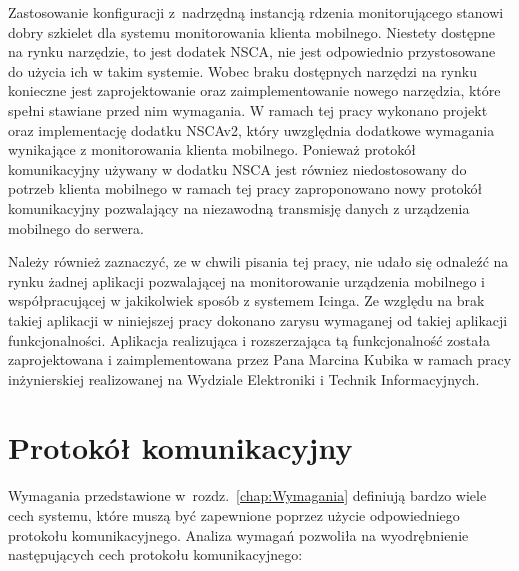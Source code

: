 Zastosowanie konfiguracji z~nadrzędną instancją rdzenia monitorującego
stanowi dobry szkielet dla systemu monitorowania klienta
mobilnego. Niestety dostępne na rynku narzędzie, to jest dodatek NSCA,
nie jest odpowiednio przystosowane do użycia ich w takim
systemie. Wobec braku dostępnych narzędzi na rynku konieczne jest
zaprojektowanie oraz zaimplementowanie nowego narzędzia, które spełni
stawiane przed nim wymagania. W ramach tej pracy wykonano projekt oraz
implementację dodatku NSCAv2, który uwzględnia dodatkowe wymagania
wynikające z monitorowania klienta mobilnego. Ponieważ protokół
komunikacyjny używany w dodatku NSCA jest równiez niedostosowany do
potrzeb klienta mobilnego w ramach tej pracy zaproponowano nowy
protokół komunikacyjny pozwalający na niezawodną transmisję danych z
urządzenia mobilnego do serwera.

Należy również zaznaczyć, ze w chwili pisania tej pracy, nie udało się
odnaleźć na rynku żadnej aplikacji pozwalającej na monitorowanie
urządzenia mobilnego i współpracującej w jakikolwiek sposób z systemem
Icinga. Ze względu na brak takiej aplikacji w niniejszej pracy
dokonano zarysu wymaganej od takiej aplikacji
funkcjonalności. Aplikacja realizująca i rozszerzająca tą
funkcjonalność została zaprojektowana i zaimplementowana przez Pana
Marcina Kubika w ramach pracy inżynierskiej\cite{book:pracaKubika}
realizowanej na Wydziale Elektroniki i Technik Informacyjnych.


\section[Protokół komunikacyjny][Protokół komunikacyjny]{Protokół komunikacyjny}
\label{sec:ProtKom}

Wymagania przedstawione w~rozdz.~\ref{chap:Wymagania} definiują bardzo wiele
cech systemu, które muszą być zapewnione poprzez użycie odpowiedniego
protokołu komunikacyjnego. Analiza wymagań pozwoliła na wyodrębnienie
następujących cech protokołu komunikacyjnego:

